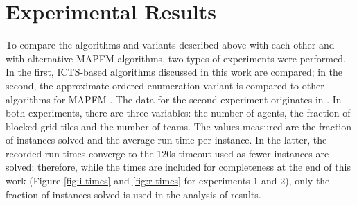 \documentclass[english]{article}
\begin{document}
	\section{Experimental Results}
	\label{experiments}
	To compare the algorithms and variants described above with each other and with alternative MAPFM algorithms, two types of experiments were performed. In the first, ICTS-based algorithms discussed in this work are compared; in the second, the approximate ordered enumeration variant is compared to other algorithms for MAPFM \cite{donszelmann2021,baauw2021,jong2021,bruin2021}. The data for the second experiment originates in \cite{donszelmann2021}.  In both experiments, there are three variables: the number of agents, the fraction of blocked grid tiles and the number of teams. The values measured are the fraction of instances solved and the average run time per instance. In the latter, the recorded run times converge to the 120s timeout used as fewer instances are solved; therefore, while the times are included for completeness at the end of this work (Figure \ref{fig:i-times} and \ref{fig:r-times} for experiments 1 and 2), only the fraction of instances solved is used in the analysis of results.
\end{document}
